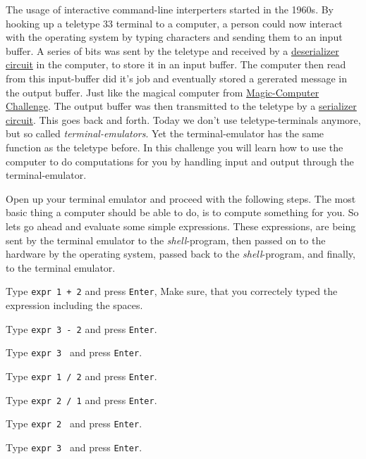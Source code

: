 \begin{challenge}
    \begin{chadescription}
        The usage of interactive command-line interperters started in the 1960s.
        By hooking up a teletype 33 terminal to a computer, a person could now interact with the operating system by typing characters and sending them to an input buffer.
        A series of bits was sent by the teletype and received by a \href{https://github.com/STEMgraph/}{deserializer circuit} in the computer, to store it in an input buffer.
        The computer then read from this input-buffer did it's job and eventually stored a gererated message in the output buffer.
        Just like the magical computer from \href{https://github.com/STEMgraph/}{Magic-Computer Challenge}.
        The output buffer was then transmitted to the teletype by a \href{https://github.com/STEMgraph/}{serializer circuit}.
        This goes back and forth. 
        Today we don't use teletype-terminals anymore, but so called \textit{terminal-emulators}.
        Yet the terminal-emulator has the same function as the teletype before. 
        In this challenge you will learn how to use the computer to do computations for you by handling input and output through the terminal-emulator.
    \end{chadescription}

    \begin{task}
        Open up your terminal emulator and proceed with the following steps.
        The most basic thing a computer should be able to do, is to compute something for you.
        So lets go ahead and evaluate some simple expressions.
        These expressions, are being sent by the terminal emulator to the \textit{shell}-program, then passed on to the hardware by the operating system, passed back to the \textit{shell}-program, and finally, to the terminal emulator.
        \begin{questions}
            \item Type \texttt{expr 1 + 2} and press \texttt{Enter}, Make sure, that you correctely typed the expression including the spaces.
            \item Type \texttt{expr 3 - 2} and press \texttt{Enter}.
            \item Type \texttt{expr 3 } and press \texttt{Enter}.
            \item Type \texttt{expr 1 / 2} and press \texttt{Enter}.
            \item Type \texttt{expr 2 / 1} and press \texttt{Enter}.
            \item Type \texttt{expr 2 } and press \texttt{Enter}.
            \item Type \texttt{expr 3 } and press \texttt{Enter}.
        \end{questions}
    \end{task}


\end{challenge}
